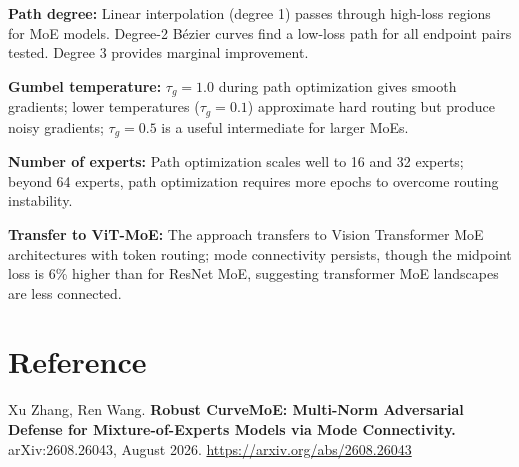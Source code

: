 \documentclass[10pt,twocolumn]{article}
\begin{document}
\textbf{Path degree:} Linear interpolation (degree 1) passes through
high-loss regions for MoE models. Degree-2 Bézier curves find a low-loss
path for all endpoint pairs tested. Degree 3 provides marginal improvement.

\textbf{Gumbel temperature:} $\tau_g = 1.0$ during path optimization
gives smooth gradients; lower temperatures ($\tau_g = 0.1$) approximate
hard routing but produce noisy gradients; $\tau_g = 0.5$ is a useful
intermediate for larger MoEs.

\textbf{Number of experts:} Path optimization scales well to 16 and
32 experts; beyond 64 experts, path optimization requires more epochs
to overcome routing instability.

\textbf{Transfer to ViT-MoE:} The approach transfers to Vision
Transformer MoE architectures with token routing; mode connectivity
persists, though the midpoint loss is 6\% higher than for ResNet MoE,
suggesting transformer MoE landscapes are less connected.

\section*{Reference}

Xu Zhang, Ren Wang.
\textbf{Robust CurveMoE: Multi-Norm Adversarial Defense for
Mixture-of-Experts Models via Mode Connectivity.}
arXiv:2608.26043, August 2026.
\url{https://arxiv.org/abs/2608.26043}
\end{document}
